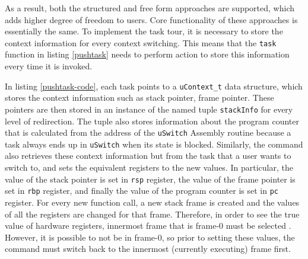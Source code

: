 As a result, both the structured and free form approaches are supported, which
adds higher degree of freedom to users. Core functionality of these approaches
is essentially the same. To implement the task tour, it is necessary
to store the context information for every context switching. This means that
the \verb|task| function in listing \ref{pushtask} needs to perform action to
store this information every time it is invoked.

In listing \ref{pushtask-code}, each task points to a \verb|uContext_t| data
structure, which stores the context
information such as stack pointer, frame pointer. These pointers are then
stored in an instance of the named tuple \verb|stackInfo| for every level of
redirection. The tuple also stores information about the program counter that
is calculated from the address of the \verb|uSwitch| Assembly routine because a task always ends up in \verb|uSwitch| when its state is blocked. Similarly, the command
also retrieves these context information but from the task that a user wants to switch to, and
sets the equivalent registers to the new values. In particular, the value of the stack
pointer is set in \verb|rsp| register, the value of the frame pointer is set in \verb|rbp|
register, and finally the value of the program counter is set in \verb|pc| register.
For every new function call, a new stack frame is created and the values of all
the registers are changed for that frame. Therefore, in
order to see the true value of hardware registers, innermost frame that is
frame-0 must be selected \cite{reference11}. However, it is possible to not be in frame-0, so prior to setting these values,
the command must switch back to the innermost (currently executing) frame first.

